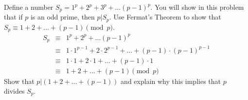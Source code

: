 \documentclass[12pt,twoside]{article}
\begin{document}




\begin{problem}{20}
Define a number
$S_p = 1^p + 2^p +3^p + \ldots (p-1)^p.$
You will show in this problem that if $p$ is an odd prime, then $p|S_p$.
\bparts
{}
 Use Fermat's Theorem to show that $S_p \equiv 1+2+\ldots + (p-1) \pmod p$.
\solution
{
\begin{eqnarray*}
S_p &\equiv& 1^p + 2^p + \ldots (p-1)^p\\
& \equiv& 1\cdot1^{p-1} + 2\cdot2^{p-1} + \ldots + (p-1)\cdot (p-1)^{p-1}\\
& \equiv& 1\cdot 1 + 2 \cdot 1 + \ldots + (p-1) \cdot 1\\
& \equiv & 1 + 2 + \ldots + (p-1) \pmod p
\end{eqnarray*}
}
Show that $p|(1+2+\ldots + (p-1))$ and explain why this implies that $p$ divides $S_p$.
\eparts
\end{problem}
\end{document}
